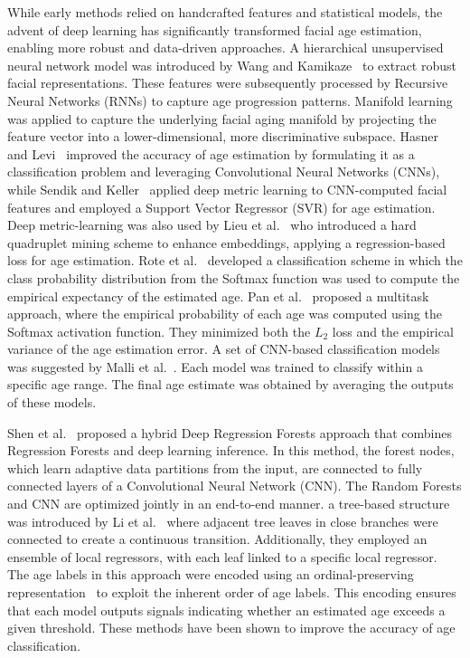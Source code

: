 While early methods relied on handcrafted features and statistical models, the
advent of deep learning has significantly transformed facial age estimation,
enabling more robust and data-driven approaches. A hierarchical unsupervised
neural network model was introduced by Wang and Kamikaze~\cite{wang2015age} to
extract robust facial representations. These features were subsequently
processed by Recursive Neural Networks (RNNs) to capture age progression
patterns. Manifold learning was applied to capture the underlying facial aging
manifold by projecting the feature vector into a lower-dimensional, more
discriminative subspace. Hasner and Levi~\cite{leviage} improved the accuracy
of age estimation by formulating it as a classification problem and leveraging
Convolutional Neural Networks (CNNs), while Sendik and Keller~\cite{deepage}
applied deep metric learning to CNN-computed facial features and employed a
Support Vector Regressor (SVR) for age estimation. Deep metric-learning was
also used by Lieu et al.~\cite{8099569} who introduced a hard quadruplet
mining scheme to enhance embeddings, applying a regression-based loss for age
estimation. Rote et al.~\cite{7406390} developed a classification scheme in
which the class probability distribution from the Softmax function was used to
compute the empirical expectancy of the estimated age. Pan et
al.~\cite{Mean-Variance} proposed a multitask approach, where the empirical
probability of each age was computed using the Softmax activation function.
They minimized both the $L_{2}$ loss and the empirical variance of the age
estimation error. A set of CNN-based classification models was suggested by
Malli et al.~\cite{7406402}. Each model was trained to classify within a
specific age range. The final age estimate was obtained by averaging the
outputs of these models.

Shen et al.~\cite{8578343} proposed a hybrid Deep Regression Forests approach
that combines Regression Forests and deep learning inference. In this method,
the forest nodes, which learn adaptive data partitions from the input, are
connected to fully connected layers of a Convolutional Neural Network (CNN).
The Random Forests and CNN are optimized jointly in an end-to-end manner. a
tree-based structure was introduced by Li et al.~\cite{8954134} where adjacent
tree leaves in close branches were connected to create a continuous
transition. Additionally, they employed an ensemble of local regressors, with
each leaf linked to a specific local regressor. The age labels in this
approach were encoded using an ordinal-preserving
representation~\cite{8099569,7780901,9145576,coral} to exploit the inherent
order of age labels. This encoding ensures that each model outputs signals
indicating whether an estimated age exceeds a given threshold. These methods
have been shown to improve the accuracy of age classification.

